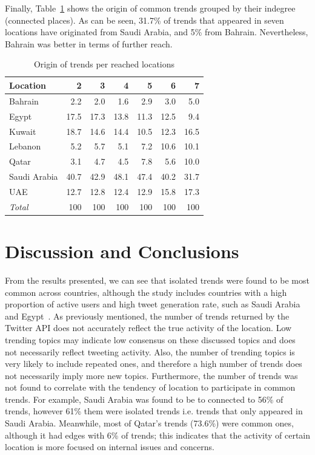 \documentclass{llncs}
\begin{document}
Finally, Table~\ref{tbl:trendorigin} shows the origin of common trends
grouped by their indegree (connected places). As can be seen, 31.7\%
of trends that appeared in seven locations have originated from Saudi
Arabia, and 5\% from Bahrain. Nevertheless, Bahrain was better in
terms of further reach.

\begin{table}[!h]
\centering
\caption{Origin of trends per reached locations}
\begin{tabular}{@{}lrrrrrr@{}}
\toprule
Location & 2 & 3 & 4 & 5 & 6 & 7 \\ 
\midrule
Bahrain &           2.2 &   2.0 &   1.6 &   2.9 &   3.0 &    5.0 \\
Egypt &            17.5 & 17.3 & 13.8 & 11.3 & 12.5 &    9.4\\
Kuwait &          18.7 & 14.6  & 14.4 & 10.5 & 12.3 & 16.5\\
Lebanon &         5.2 &   5.7 &    5.1 &   7.2 & 10.6 & 10.1 \\
Qatar &              3.1 &   4.7 &    4.5 &   7.8 &   5.6 & 10.0 \\
Saudi Arabia & 40.7 & 42.9 &  48.1 & 47.4 & 40.2 & 31.7 \\
UAE &              12.7 & 12.8 &  12.4 & 12.9 & 15.8 & 17.3 \\
\midrule
{\emph{Total}} & 100 & 100 & 100 & 100 & 100 &  100 \\
\bottomrule
\end{tabular}
\label{tbl:trendorigin}
\end{table}

\vspace{-2em}
\section{Discussion and Conclusions}\label{dissconc}

From the results presented, we can see that isolated trends were found to be
most common across countries, although the study includes countries
with a high proportion of active users and high tweet generation rate,
such as Saudi Arabia and Egypt~\cite{Salem2017}. As previously
mentioned, the number of trends returned by the Twitter API does not
accurately reflect the true activity of the location. Low trending
topics may indicate low consensus on these discussed topics and does
not necessarily reflect tweeting activity. Also, the number of
trending topics is very likely to include repeated ones, and therefore
a high number of trends does not necessarily imply more new
topics. Furthermore, the number of trends was not found to correlate
with the tendency of location to participate in common trends. For
example, Saudi Arabia was found to be to connected to 56\% of trends,
however 61\% them were isolated trends i.e. trends that only appeared
in Saudi Arabia. Meanwhile, most of Qatar's trends (73.6\%) were
common ones, although it had edges with 6\% of trends; this indicates
that the activity of certain location is more focused on internal
issues and concerns.
\end{document}
